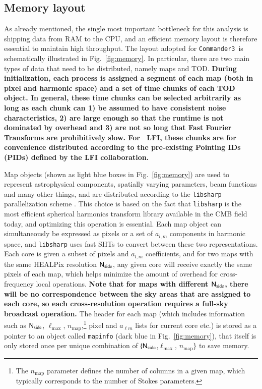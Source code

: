 \documentclass[twocolumn]{aa}
\def\commanderthree{\texttt{Commander3}}
\newcommand{\N}[0]{\tens{N}}
\begin{document}
\subsection{Memory layout}
\label{sec:mem_layout}

As already mentioned, the single most important bottleneck for this
analysis is shipping data from RAM to the CPU, and an efficient memory
layout is therefore essential to maintain high throughput. The layout
adopted for \commanderthree\ is schematically illustrated in
Fig.~\ref{fig:memory}. In particular, there are two main types of data
that need to be distributed, namely maps and TOD. \textbf{During
initialization, each process is assigned a segment of each map (both
in pixel and harmonic space) and a set of time chunks of each TOD
object. In general, these time chunks can be selected arbitrarily as long as each chunk can 1) be assumed to have consistent noise characteristics, 2) are large enough so that the runtime is not dominated by overhead and 3) are not so long that Fast Fourier Transforms are prohibitively slow.
For \Planck\ LFI, these chunks are for convenience distributed
according to the pre-existing Pointing IDs (PIDs) defined by the LFI collaboration.}

Map objects (shown as light blue boxes in Fig.~\ref{fig:memory}) are
used to represent astrophysical components, spatially varying
parameters, beam functions and many other things, and are distributed
according to the \texttt{libsharp} parallelization scheme
\citep{libsharp}. This choice is based on the fact that
\texttt{libsharp} is the most efficient spherical harmonics transform
library available in the CMB field today, and optimizing this
operation is essential. Each map object can simultaneously be
expressed as pixels or a set of $a_{l,m}$ components in harmonic
space, and \texttt{libsharp} uses fast SHTs to convert between these
two representations. Each core is given a subset of pixels and
$a_{l,m}$ coefficients, and for two maps with the same HEALPix
resolution $\N_{\mathrm{side}}$, any given core will receive exactly
the same pixels of each map, which helps minimize the amount of
overhead for cross-frequency local operations. \textbf{Note that for maps with different $\N_{\mathrm{side}}$, there will be no correspondence between the sky areas that are assigned to each core, so each cross-resolution operation requires a full-sky broadcast operation.}
 The header for each map (which includes information such as $\N_{\mathrm{side}}$,
$\ell_{\mathrm{max}}$, $n_{\mathrm{map}}$,\footnote{The
  $n_{\mathrm{map}}$ parameter defines the number of columns in a
  given map, which typically corresponds to the number of Stokes
  parameters.} pixel and $a_{\ell m}$ lists for current core etc.) is
stored as a pointer to an object called \texttt{mapinfo} (dark blue in
Fig.~\ref{fig:memory}), that itself is only stored once per unique
combination of $\{\N_{\mathrm{side}}$,$\ell_{\mathrm{max}}$,
$n_{\mathrm{map}}\}$ to save memory.
\end{document}
